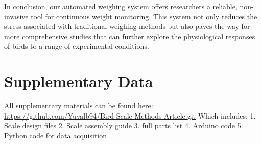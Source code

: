 \documentclass{article}
\begin{document}
In conclusion, our automated weighing system offers researchers a reliable, non-invasive tool for continuous weight monitoring. This system not only reduces the stress associated with traditional weighing methods but also paves the way for more comprehensive studies that can further explore the physiological responses of birds to a range of experimental conditions.

\section{Supplementary Data} \label{sec:supplementary}
All supplementary materials can be found here: \url{https://github.com/Yuvalb94/Bird-Scale-Methods-Article.git}
Which includes:
1. Scale design files
2. Scale assembly guide
3. full parts list
4. Arduino code 
5. Python code for data acquisition

    
\end{document}
